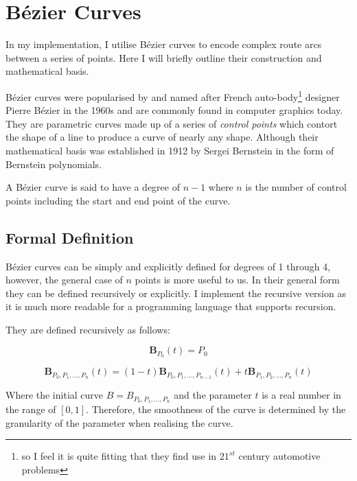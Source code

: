 \section{Bézier Curves}
\label{sec:back-bezier-curves}

In my implementation, I utilise Bézier curves to encode complex route arcs between a series of points. Here I will briefly outline their construction and mathematical basis.

Bézier curves were popularised by and named after French auto-body\footnote{so I feel it is quite fitting that they find use in $21^{st}$ century automotive problems} designer Pierre Bézier in the 1960s and are commonly found in computer graphics today. They are parametric curves made up of a series of \textit{control points} which contort the shape of a line to produce a curve of nearly any shape. Although their mathematical basis was established in 1912 by Sergei Bernstein in the form of Bernstein polynomials\cite{bernstein1912best}.

A Bézier curve is said to have a degree of $n-1$ where $n$ is the number of control points including the start and end point of the curve.

\subsection{Formal Definition}

Bézier curves can be simply and explicitly defined for degrees of 1 through 4, however, the general case of $n$ points is more useful to us. In their general form they can be defined recursively or explicitly. I implement the recursive version as it is much more readable for a programming language that supports recursion.

They are defined recursively as follows:

\begin{equation}
    \textbf{B}_{P_0}(t) = P_0
\end{equation}

\begin{equation}
    \textbf{B}_{P_0,P_1,\ldots,P_n}(t) = (1-t)\textbf{B}_{P_0,P_1,\ldots,P_{n-1}}(t) + t\textbf{B}_{P_1,P_2,\ldots,P_n}(t)
  \end{equation}

  Where the initial curve $B = B_{P_{0},P_{1},\ldots,P_{n}}$ and the parameter $t$ is a real number in the range of $[0,1]$. Therefore, the smoothness of the curve is determined by the granularity of the parameter when realising the curve.

